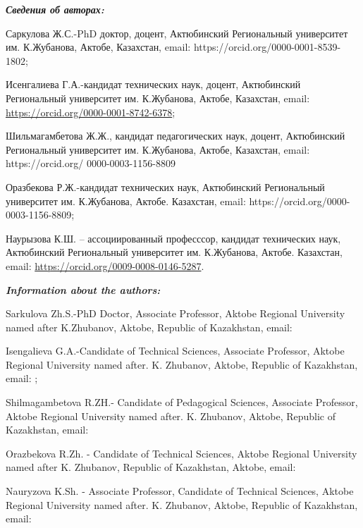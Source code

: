 \begin{authorinfo}
\emph{{\bfseries Сведения об авторах:}}

Саркулова Ж.С.-PhD доктор, доцент, Актюбинский Региональный университет
им. К.Жубанова, Актобе, Казахстан, email:
\href{mailto:zhadi_0691@mail.ru}{}
https://orcid.org/0000-0001-8539-1802;

Исенгалиева Г.А.-кандидат технических наук, доцент, Актюбинский
Региональный университет им. К.Жубанова, Актобе, Казахстан, email:
\href{mailto:isengul@mail.ru}{}
\url{https://orcid.org/0000-0001-8742-6378};

Шильмагамбетова Ж.Ж., кандидат педагогических наук, доцент, Актюбинский
Региональный университет им. К.Жубанова, Актобе, Казахстан, email:
\href{mailto:Zhadra_69@mail.ru}{}
https://orcid.org/ 0000-0003-1156-8809 

Оразбекова Р.Ж.-кандидат технических наук, Актюбинский Региональный
университет им. К.Жубанова, Актобе. Казахстан, email:
\href{mailto:riza_O@mail.ru}{}
https://orcid.org/0000-0003-1156-8809;

Наурызова К.Ш. -- ассоциированный професссор, кандидат технических наук,
Актюбинский Региональный университет им. К.Жубанова, Актобе. Казахстан,
email: \href{mailto:nauryzova61@mail.ru}{}
\url{https://orcid.org/0009-0008-0146-5287}.

\emph{{\bfseries Information about the authors:}}

Sarkulova Zh.S.-PhD Doctor, Associate Professor, Aktobe Regional
University named after K.Zhubanov, Aktobe, Republic of Kazakhstan,
email:

Isengalieva G.A.-Candidate of Technical Sciences, Associate Professor,
Aktobe Regional University named after. K. Zhubanov, Aktobe, Republic of
Kazakhstan, email: \href{mailto:isengul@mail.ru}{}
\href{https://orcid.org/0000-0001-8742-6378}{};

Shilmagambetova R.ZH.- Candidate of Pedagogical Sciences, Associate
Professor, Aktobe Regional University named after. K. Zhubanov, Aktobe,
Republic of Kazakhstan, email:

Orazbekova R.Zh. - Candidate of Technical Sciences, Aktobe Regional
University named after K. Zhubanov, Republic of Kazakhstan, Aktobe,
email: \href{mailto:riza_O@mail.ru}{}

Nauryzova K.Sh. - Associate Professor, Candidate of Technical Sciences,
Aktobe Regional University named after. K. Zhubanov, Aktobe, Republic of
Kazakhstan, email:
\href{mailto:nauryzova61@mail.ru}{}
\href{https://orcid.org/0009-0008-0146-5287}{}
\end{authorinfo}
